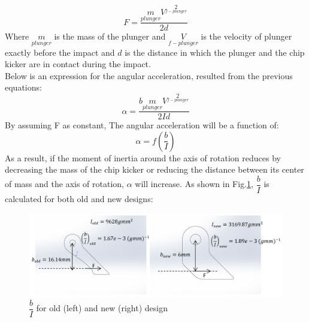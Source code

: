 \begin{equation}
F=\dfrac{m\limits_{plunger} {V}^2\limits_{f-plunger}}{2d}
\end{equation}
Where $m\limits_{plunger}$ is the mass of the plunger and ${V}\limits_{f-plunger}$ is the velocity of plunger exactly before the impact and $d$ is the distance in which the plunger and the chip kicker are in contact during the impact.\\
Below is an expression for the angular acceleration, resulted from the previous equations:
\begin{equation}
\alpha = \dfrac{b m\limits_{plunger} {V}^2\limits_{f-plunger}}{2Id}
\end{equation}
By assuming F as constant, The angular acceleration will be a function of:
\begin{equation}
\alpha=f(\dfrac{b}{I})
\end{equation}
As a result, if the moment of inertia around the axis of rotation reduces by decreasing the mass of the chip kicker or reducing the distance between its center of mass and the axis of rotation, $\alpha$ will increase.
As shown in Fig.\ref{fig:CHIP_SIDE_VIEW}, $\dfrac{b}{I}$ is calculated for both old and new designs:\\
\begin{figure}
	\centering
	\includegraphics[width=1.0\textwidth]{images/SIDE_VIEW_CHIP.png}
	\caption{$\dfrac{b}{I}$ for old (left) and new (right) design}
	\label{fig:CHIP_SIDE_VIEW}
\end{figure}\\

